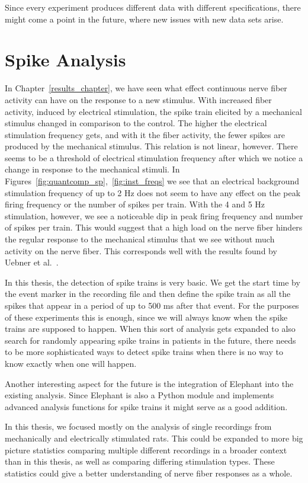 Since every experiment produces different data with different specifications, there might come a point in the future, where new issues with new data sets arise.

\section{Spike Analysis}
In Chapter~\ref{results_chapter}, we have seen what effect continuous nerve fiber activity can have on the response to a new stimulus. With increased fiber activity, induced by electrical stimulation, the spike train elicited by a mechanical stimulus changed in comparison to the control. The higher the electrical stimulation frequency gets, and with it the fiber activity, the fewer spikes are produced by the mechanical stimulus. This relation is not linear, however. There seems to be a threshold of electrical stimulation frequency after which we notice a change in response to the mechanical stimuli. In Figures~\ref{fig:quantcomp_sp},~\ref{fig:inst_freqs} we see that an electrical background stimulation frequency of up to 2 Hz does not seem to have any effect on the peak firing frequency or the number of spikes per train. With the 4 and 5 Hz stimulation, however, we see a noticeable dip in peak firing frequency and number of spikes per train. This would suggest that a high load on the nerve fiber hinders the regular response to the mechanical stimulus that we see without much activity on the nerve fiber. This corresponds well with the results found by Uebner et al.~\cite{roberto}.

In this thesis, the detection of spike trains is very basic. We get the start time by the event marker in the recording file and then define the spike train as all the spikes that appear in a period of up to 500 ms after that event. For the purposes of these experiments this is enough, since we will always know when the spike trains are supposed to happen. When this sort of analysis gets expanded to also search for randomly appearing spike trains in patients in the future, there needs to be more sophisticated ways to detect spike trains when there is no way to know exactly when one will happen.

Another interesting aspect for the future is the integration of Elephant into the existing analysis. Since Elephant is also a Python module and implements advanced analysis functions for spike trains it might serve as a good addition. 

In this thesis, we focused mostly on the analysis of single recordings from mechanically and electrically stimulated rats. This could be expanded to more big picture statistics comparing multiple different recordings in a broader context than in this thesis, as well as comparing differing stimulation types. These statistics could give a better understanding of nerve fiber responses as a whole.





\cleardoublepage
